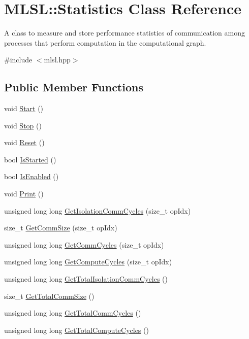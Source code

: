 \hypertarget{classMLSL_1_1Statistics}{\section{M\-L\-S\-L\-:\-:Statistics Class Reference}
\label{classMLSL_1_1Statistics}
}


A class to measure and store performance statistics of communication among processes that perform computation in the computational graph.  




{\ttfamily \#include $<$mlsl.\-hpp$>$}

\subsection*{Public Member Functions}
\begin{DoxyCompactItemize}
\item 
void \hyperlink{classMLSL_1_1Statistics_ac173f46251f1733a057e3d57723cb4a3}{Start} ()
\item 
void \hyperlink{classMLSL_1_1Statistics_acfa11bde67753006289bc571463cf14b}{Stop} ()
\item 
void \hyperlink{classMLSL_1_1Statistics_a3b94e3f38700cb737f740e3e899b7d87}{Reset} ()
\item 
bool \hyperlink{classMLSL_1_1Statistics_ac19290d3f561f101c5a70f63b0a80e41}{Is\-Started} ()
\item 
bool \hyperlink{classMLSL_1_1Statistics_a66b3cabc6bacc175659bb82c7cbb9939}{Is\-Enabled} ()
\item 
void \hyperlink{classMLSL_1_1Statistics_aebec5c8f85db34be6af88d5d6eb9f122}{Print} ()
\item 
unsigned long long \hyperlink{classMLSL_1_1Statistics_a34c311c5ac0f725dcfafe425f3bd0f9a}{Get\-Isolation\-Comm\-Cycles} (size\-\_\-t op\-Idx)
\item 
size\-\_\-t \hyperlink{classMLSL_1_1Statistics_afcd2fc8a168865016ad75dbca4cd5033}{Get\-Comm\-Size} (size\-\_\-t op\-Idx)
\item 
unsigned long long \hyperlink{classMLSL_1_1Statistics_a8591dea86b3c871763b2006c205662d2}{Get\-Comm\-Cycles} (size\-\_\-t op\-Idx)
\item 
unsigned long long \hyperlink{classMLSL_1_1Statistics_a7772490eb71c397c500c99389e8da21d}{Get\-Compute\-Cycles} (size\-\_\-t op\-Idx)
\item 
unsigned long long \hyperlink{classMLSL_1_1Statistics_a43579639543144d2f5655e08b5edec9c}{Get\-Total\-Isolation\-Comm\-Cycles} ()
\item 
size\-\_\-t \hyperlink{classMLSL_1_1Statistics_af6d0b83154c9ee3a632baf9f2dcd82cb}{Get\-Total\-Comm\-Size} ()
\item 
unsigned long long \hyperlink{classMLSL_1_1Statistics_a6ed3157fc2b0b490a7dab4a3101f9e94}{Get\-Total\-Comm\-Cycles} ()
\item 
unsigned long long \hyperlink{classMLSL_1_1Statistics_a7acb51f50741e7b7ac3f14e248fd7943}{Get\-Total\-Compute\-Cycles} ()
\end{DoxyCompactItemize}


